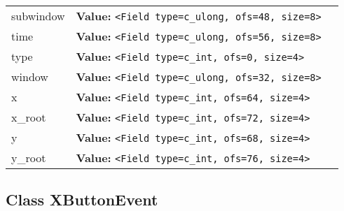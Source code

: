 \begin{longtable}{|p{\varnamewidth}|p{\vardescrwidth}|l}
\cline{1-2}
\raggedright s\-u\-b\-w\-i\-n\-d\-o\-w\- & \raggedright \textbf{Value:} 
{\tt {\textless}Field type=c\_ulong, ofs=48, size=8{\textgreater}}&\\
\cline{1-2}
\raggedright t\-i\-m\-e\- & \raggedright \textbf{Value:} 
{\tt {\textless}Field type=c\_ulong, ofs=56, size=8{\textgreater}}&\\
\cline{1-2}
\raggedright t\-y\-p\-e\- & \raggedright \textbf{Value:} 
{\tt {\textless}Field type=c\_int, ofs=0, size=4{\textgreater}}&\\
\cline{1-2}
\raggedright w\-i\-n\-d\-o\-w\- & \raggedright \textbf{Value:} 
{\tt {\textless}Field type=c\_ulong, ofs=32, size=8{\textgreater}}&\\
\cline{1-2}
\raggedright x\- & \raggedright \textbf{Value:} 
{\tt {\textless}Field type=c\_int, ofs=64, size=4{\textgreater}}&\\
\cline{1-2}
\raggedright x\-\_\-r\-o\-o\-t\- & \raggedright \textbf{Value:} 
{\tt {\textless}Field type=c\_int, ofs=72, size=4{\textgreater}}&\\
\cline{1-2}
\raggedright y\- & \raggedright \textbf{Value:} 
{\tt {\textless}Field type=c\_int, ofs=68, size=4{\textgreater}}&\\
\cline{1-2}
\raggedright y\-\_\-r\-o\-o\-t\- & \raggedright \textbf{Value:} 
{\tt {\textless}Field type=c\_int, ofs=76, size=4{\textgreater}}&\\
\cline{1-2}
\end{longtable}



\subsection{Class XButtonEvent}

